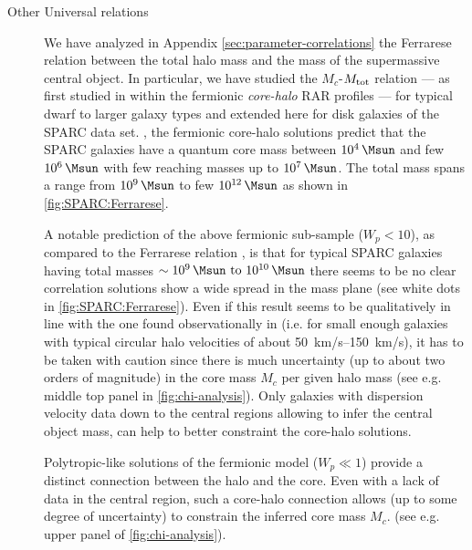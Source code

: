 \begin{description}
\item[Other Universal relations] We have analyzed in Appendix \ref{sec:parameter-correlations} the Ferrarese relation between the total halo mass and the mass of the supermassive central object. In particular, we have studied the $M_c$-$M_{\rm tot}$ relation --- as first studied in \citet{2019PDU....24..278A} within the fermionic \textit{core-halo} RAR profiles --- for typical dwarf to larger galaxy types and extended here for disk galaxies of the SPARC data set. , the fermionic core-halo solutions predict that the SPARC galaxies have a quantum core mass between $\SI{E4}{\Msun}$ and few $\SI{E6}{\Msun}$ with few reaching masses up to $\SI{E7}{\Msun}$. The total mass spans a range from $\SI{E9}{\Msun}$ to few $\SI{E12}{\Msun}$ as shown in \cref{fig:SPARC:Ferrarese}.

A notable prediction of the above fermionic sub-sample ($W_p < 10$), as compared to the Ferrarese relation \citep{2002ApJ...578...90F}, is that for typical SPARC galaxies having total masses $\sim \SIrange{E9}{E10}{\Msun}$ there seems to be no clear correlation  solutions show a wide spread in the mass plane (see white dots in \cref{fig:SPARC:Ferrarese}). Even if this result seems to be qualitatively in line with the one found observationally in \cite{2011Natur.469..377K} (i.e. for small enough galaxies with typical circular halo velocities of about \SIrange{50}{150}{\kilo\metre/\second}), it has to be taken with caution since there is much uncertainty (up to about two orders of magnitude) in the core mass $M_c$ per given halo mass (see e.g. middle top panel in \cref{fig:chi-analysis}). Only galaxies with dispersion velocity data down to the central regions allowing to infer the central object mass, can help to better constraint the core-halo solutions.

Polytropic-like solutions of the fermionic model ($W_p \ll 1$) provide a distinct connection between the halo and the core. Even with a lack of data in the central region, such a core-halo connection allows (up to some degree of uncertainty) to constrain the inferred core mass $M_c$. (see e.g. upper panel of \cref{fig:chi-analysis}). 


\end{description}
